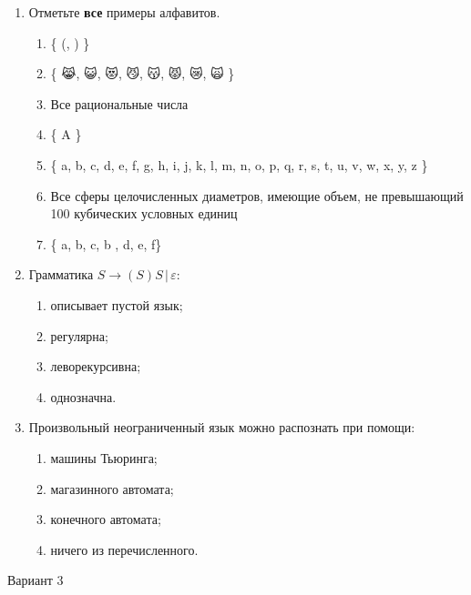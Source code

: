 \documentclass[12pt]{article}
\begin{document}
\begin{enumerate}
    \item Отметьте \textbf{все} примеры алфавитов.
    \begin{enumerate}
        \item \{ (, ) \}
        \item \{ 😹, 😺, 😻, 😼, 😽, 😾, 😿, 🙀 \}
        \item Все рациональные числа
        \item \{ A \}
        \item \{ a, b, c, d, e, f, g, h, i, j, k, l, m, n, o, p, q, r, s, t, u, v, w, x, y, z \}
        \item Все сферы целочисленных диаметров, имеющие объем, не превышающий 100 кубических условных единиц
        \item \{ a, b, c, b , d, e, f\}
    \end{enumerate}    
            
    \item Грамматика $S \rightarrow ( S ) S \, | \, \varepsilon $:
    \begin{enumerate}
        \item описывает пустой язык; 
        \item регулярна;
        \item леворекурсивна;
        \item однозначна.
    \end{enumerate}

    \item Произвольный неограниченный язык можно распознать при помощи: 
    \begin{enumerate}
        \item машины Тьюринга;
        \item магазинного автомата;
        \item конечного автомата;
        \item ничего из перечисленного.
    \end{enumerate}
\end{enumerate}

\pagebreak

\medskip
{\Large Вариант 3}
\medskip
\end{document}

